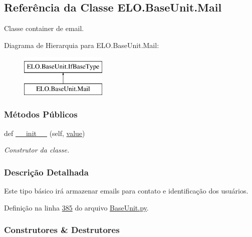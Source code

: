 \hypertarget{classELO_1_1BaseUnit_1_1Mail}{}\subsection{Referência da Classe E\+L\+O.\+Base\+Unit.\+Mail}
\label{classELO_1_1BaseUnit_1_1Mail}


Classe container de email.  


Diagrama de Hierarquia para E\+L\+O.\+Base\+Unit.\+Mail\+:\begin{figure}[H]
\begin{center}
\leavevmode
\includegraphics[height=2.000000cm]{d5/db6/classELO_1_1BaseUnit_1_1Mail}
\end{center}
\end{figure}
\subsubsection*{Métodos Públicos}
\begin{DoxyCompactItemize}
\item 
def \hyperlink{classELO_1_1BaseUnit_1_1Mail_a1a03bcc4d4ad5612c96614308b582fc0}{\+\_\+\+\_\+init\+\_\+\+\_\+} (self, \hyperlink{classELO_1_1BaseUnit_1_1IfBaseType_a2534c3548a8e5991dde0a64b4f0b542b}{value})
\begin{DoxyCompactList}\small\item\em Construtor da classe. \end{DoxyCompactList}\end{DoxyCompactItemize}


\subsubsection{Descrição Detalhada}
Este tipo básico irá armazenar emails para contato e identificação dos usuários. 

Definição na linha \hyperlink{BaseUnit_8py_source_l00385}{385} do arquivo \hyperlink{BaseUnit_8py_source}{Base\+Unit.\+py}.



\subsubsection{Construtores \& Destrutores}
\hypertarget{classELO_1_1BaseUnit_1_1Mail_a1a03bcc4d4ad5612c96614308b582fc0}{}
